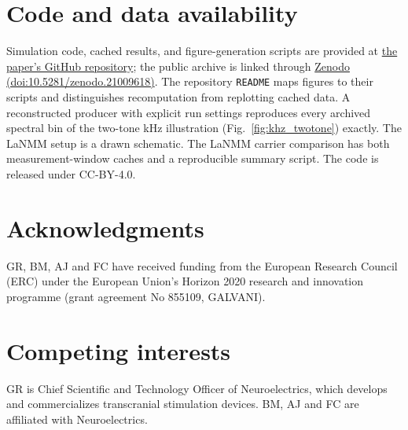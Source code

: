 \documentclass[11pt,a4paper]{article}
\newif\ifjne
\begin{document}
\section*{Code and data availability}
Simulation code, cached results, and figure-generation scripts are provided at
\href{https://github.com/giulioruffini/TI-demodulation-paper}{the paper's GitHub repository};
the public archive is linked through
\href{https://doi.org/10.5281/zenodo.21009618}{Zenodo (doi:10.5281/zenodo.21009618)}.
The repository \texttt{README} maps figures to their scripts and distinguishes
recomputation from replotting cached data. A reconstructed producer with explicit
run settings reproduces every archived spectral bin of the two-tone kHz
illustration (Fig.~\ref{fig:khz_twotone}) exactly. The LaNMM setup
is a drawn schematic. The LaNMM carrier comparison has both measurement-window
caches and a reproducible summary script. The code is released under CC-BY-4.0.

\section*{Acknowledgments}
GR, BM, AJ and FC have received funding from the European Research Council (ERC) under the
European Union's Horizon 2020 research and innovation programme (grant agreement No 855109,
GALVANI).

\ifjne
\section*{Competing interests}
GR is Chief Scientific and Technology Officer of Neuroelectrics, which develops and
commercializes transcranial stimulation devices. BM, AJ and FC are affiliated with
Neuroelectrics.
\end{document}
